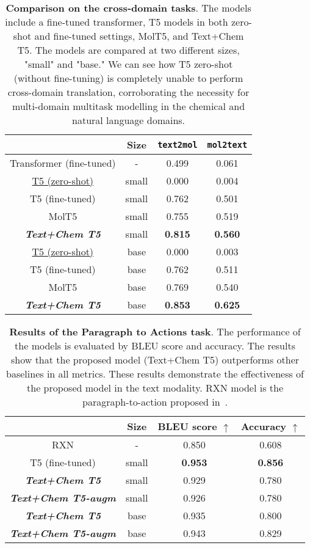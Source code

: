\documentclass[nohyperref]{article}
\theoremstyle{plain}
\theoremstyle{definition}
\theoremstyle{remark}
\begin{document}
\begin{table}[ht]
    \centering
    \caption{\textbf{Comparison on the cross-domain tasks}. 
    The models include a fine-tuned transformer, T5 models in both zero-shot and fine-tuned settings, MolT5, and Text+Chem T5. The models are compared at two different sizes, "small" and "base." We can see how T5 zero-shot (without fine-tuning) is completely unable to perform cross-domain translation, corroborating the necessity for multi-domain multitask modelling in the chemical and natural language domains.
    }
    \begin{tabular}{c c | cc}
    \toprule
    & Size & \texttt{text2mol} & \texttt{mol2text} \\
    \midrule
    Transformer (fine-tuned) & - & 0.499 & 0.061  \\
    \underline{T5 (zero-shot)}    & small & 0.000  & 0.004 \\
    T5 (fine-tuned)    & small & 0.762  & 0.501 \\
    MolT5             & small & 0.755 & 0.519  \\
    \textbf{\emph{Text+Chem T5}} & small & \textbf{0.815} & \textbf{0.560} \\
    \midrule
    \underline{T5 (zero-shot)}    & base & 0.000  & 0.003 \\
    T5 (fine-tuned)    & base & 0.762  & 0.511 \\
    MolT5             & base & 0.769 & 0.540  \\
    \textbf{\emph{Text+Chem T5}} & base & \textbf{0.853} & \textbf{0.625} \\
    \bottomrule
    \end{tabular}
    \label{tab:experiments-appendix}
\end{table}

\begin{table}[ht]
    \centering
    \caption{\textbf{Results of the Paragraph to Actions task}. 
    The performance of the models is evaluated by BLEU score and accuracy. The results show that the proposed model (Text+Chem T5) outperforms other baselines in all metrics. These results demonstrate the effectiveness of the proposed model in the text modality. RXN model is the paragraph-to-action proposed in~\citep{vaucher2020automated}.
    }
    \begin{tabular}{cc | cc}
    \toprule
     & Size & BLEU score $\uparrow$ &Accuracy $\uparrow$ \\
    \midrule
    RXN & - & 0.850 & 0.608\\
    T5 (fine-tuned) & small & \textbf{0.953} & \textbf{0.856} \\
    \textbf{\emph{Text+Chem T5}} & small &0.929&0.780 \\
    \textbf{\emph{Text+Chem T5-augm}} & small & 0.926&0.780 \\
    \midrule
    \textbf{\emph{Text+Chem T5}} & base & 0.935 & 0.800  \\
    \textbf{\emph{Text+Chem T5-augm}} & base & 0.943 & 0.829  \\
    \bottomrule
    \end{tabular}
    \label{tab:experiments-paragraph-to-actions}
\end{table}
\end{document}
